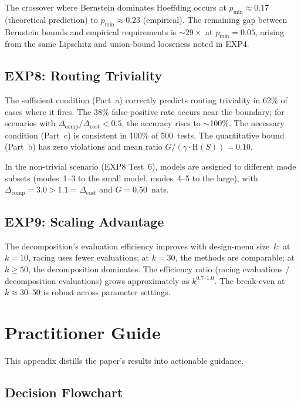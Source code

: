 \documentclass[twoside,11pt]{article}
\newcommand{\pmin}{p_{\min}}
\newcommand{\Hent}{\mathrm{H}}
\begin{document}
The crossover where Bernstein dominates Hoeffding occurs at $\pmin \approx 0.17$ (theoretical prediction) to $\pmin \approx 0.23$ (empirical).
The remaining gap between Bernstein bounds and empirical requirements is $\sim 29\times$ at $\pmin = 0.05$, arising from the same Lipschitz and union-bound looseness noted in EXP4.

\subsection{EXP8: Routing Triviality}

The sufficient condition (Part~a) correctly predicts routing triviality in 62\% of cases where it fires.
The 38\% false-positive rate occurs near the boundary; for scenarios with $\Delta_{\mathrm{comp}}/\Delta_{\mathrm{cost}} < 0.5$, the accuracy rises to $\sim$100\%.
The necessary condition (Part~c) is consistent in 100\% of 500~tests.
The quantitative bound (Part~b) has zero violations and mean ratio $G/(\gamma \cdot \Hent(S)) = 0.10$.

In the non-trivial scenario (EXP8 Test~6), models are assigned to different mode subsets (modes~1--3 to the small model, modes~4--5 to the large), with $\Delta_{\mathrm{comp}} = 3.0 > 1.1 = \Delta_{\mathrm{cost}}$ and $G = 0.50$~nats.

\subsection{EXP9: Scaling Advantage}

The decomposition's evaluation efficiency improves with design-menu size~$k$:
at $k = 10$, racing uses fewer evaluations;
at $k = 30$, the methods are comparable;
at $k \ge 50$, the decomposition dominates.
The efficiency ratio (racing evaluations / decomposition evaluations) grows approximately as $k^{0.7\text{--}1.0}$.
The break-even at $k \approx 30\text{--}50$ is robust across parameter settings.
\section{Practitioner Guide}
\label{app:practitioner}

This appendix distills the paper's results into actionable guidance.

\subsection{Decision Flowchart}
\end{document}
